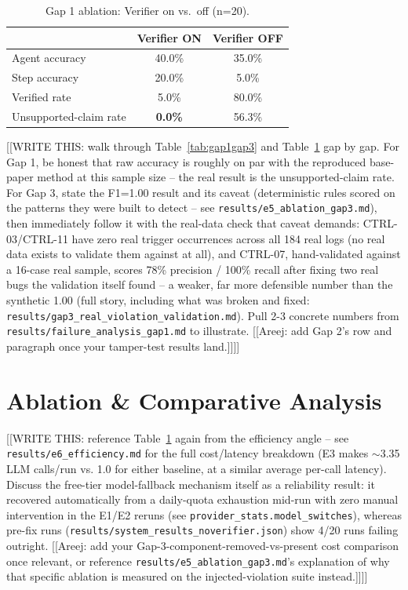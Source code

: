 \documentclass[conference]{IEEEtran}
\begin{document}
\begin{table}[t]
\centering
\caption{Gap 1 ablation: Verifier on vs.\ off (n=20).}
\label{tab:ablation}
\small
\begin{tabular}{@{}lcc@{}}
\toprule
 & Verifier ON & Verifier OFF \\
\midrule
Agent accuracy       & 40.0\% & 35.0\% \\
Step accuracy        & 20.0\% & 5.0\%  \\
Verified rate        & 5.0\%  & 80.0\% \\
Unsupported-claim rate & \textbf{0.0\%} & 56.3\% \\
\bottomrule
\end{tabular}
\end{table}

[[WRITE THIS: walk through Table~\ref{tab:gap1gap3} and
Table~\ref{tab:ablation} gap by gap. For Gap 1, be honest that raw accuracy
is roughly on par with the reproduced base-paper method at this sample
size -- the real result is the unsupported-claim rate. For Gap 3, state
the F1=1.00 result and its caveat (deterministic rules scored on the
patterns they were built to detect -- see
\texttt{results/e5\_ablation\_gap3.md}), then immediately follow it with
the real-data check that caveat demands: CTRL-03/CTRL-11 have zero real
trigger occurrences across all 184 real logs (no real data exists to
validate them against at all), and CTRL-07, hand-validated against a
16-case real sample, scores 78\% precision / 100\% recall after fixing
two real bugs the validation itself found -- a weaker, far more
defensible number than the synthetic 1.00 (full story, including what was
broken and fixed: \texttt{results/gap3\_real\_violation\_validation.md}).
Pull 2-3 concrete numbers from \texttt{results/failure\_analysis\_gap1.md}
to illustrate. [[Areej: add Gap 2's row and paragraph once your
tamper-test results land.]]]]

\section{Ablation \& Comparative Analysis}
\label{sec:ablation}
[[WRITE THIS: reference Table~\ref{tab:ablation} again from the efficiency
angle -- see \texttt{results/e6\_efficiency.md} for the full cost/latency
breakdown (E3 makes $\sim$3.35 LLM calls/run vs. 1.0 for either baseline,
at a similar average per-call latency). Discuss the free-tier model-fallback
mechanism itself as a reliability result: it recovered automatically from a
daily-quota exhaustion mid-run with zero manual intervention in the E1/E2
reruns (see \texttt{provider\_stats.model\_switches}), whereas pre-fix runs
(\texttt{results/system\_results\_noverifier.json}) show 4/20 runs failing
outright. [[Areej: add your Gap-3-component-removed-vs-present cost
comparison once relevant, or reference
\texttt{results/e5\_ablation\_gap3.md}'s explanation of why that specific
ablation is measured on the injected-violation suite instead.]]]]
\end{document}
